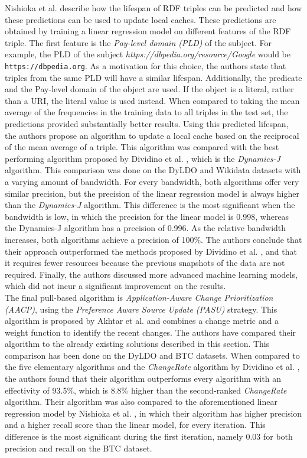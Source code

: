 \noindent Nishioka et al. \cite{nishioka_scherp_2017} describe how the lifespan of RDF triples can be predicted and how these predictions can be used to update local caches. These predictions are obtained by training a linear regression model on different features of the RDF triple. The first feature is the \emph{Pay-level domain (PLD)} of the subject. For example, the PLD of the subject \emph{https://dbpedia.org/resource/Google} would be \texttt{https://dbpedia.org}. As a motivation for this choice, the authors state that triples from the same PLD will have a similar lifespan. Additionally, the predicate and the Pay-level domain of the object are used. If the object is a literal, rather than a URI, the literal value is used instead. When compared to taking the mean average of the frequencies in the training data to all triples in the test set, the predictions provided substantially better results. Using this predicted lifespan, the authors propose an algorithm to update a local cache based on the reciprocal of the mean average of a triple. This algorithm was compared with the best performing algorithm proposed by Dividino et al. \cite{ISI:000374242500024}, which is the \emph{Dynamics-J} algorithm. This comparison was done on the DyLDO and Wikidata datasets with a varying amount of bandwidth. For every bandwidth, both algorithms offer very similar precision, but the precision of the linear regression model is always higher than the \emph{Dynamics-J} algorithm. This difference is the most significant when the bandwidth is low, in which the precision for the linear model is 0.998, whereas the Dynamics-J algorithm has a precision of 0.996. As the relative bandwidth increases, both algorithms achieve a precision of 100\%. The authors conclude that their approach outperformed the methods proposed by Dividino et al. \cite{ISI:000374242500024}, and that it requires fewer resources because the previous snapshots of the data are not required. Finally, the authors discussed more advanced machine learning models, which did not incur a significant improvement on the results.\\

\noindent The final pull-based algorithm is \emph{Application-Aware Change Prioritization (AACP)}, using the \emph{Preference Aware Source Update (PASU)} strategy. This algorithm is proposed by Akhtar et al. \cite{Akhtar2018} and combines a change metric and a weight function to identify the recent changes. The authors have compared their algorithm to the already existing solutions described in this section. This comparison has been done on the DyLDO and BTC datasets. When compared to the five elementary algorithms and the \emph{ChangeRate} algorithm by Dividino et al. \cite{ISI:000374242500024}, the authors found that their algorithm outperforms every algorithm with an effectivity of 93.5\%, which is 8.8\% higher than the second-ranked \emph{ChangeRate} algorithm. Their algorithm was also compared to the aforementioned linear regression model by Nishioka et al. \cite{nishioka_scherp_2017}, in which their algorithm has higher precision and a higher recall score than the linear model, for every iteration. This difference is the most significant during the first iteration, namely 0.03 for both precision and recall on the BTC dataset.

